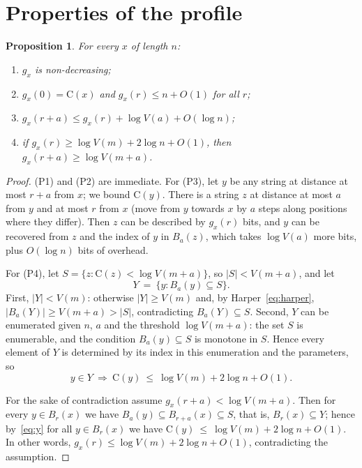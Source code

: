 \documentclass[11pt,a4paper]{article}
\newtheorem{proposition}[theorem]{Proposition}
\theoremstyle{definition}
\newcommand{\C}{\mathrm{C}}
\renewcommand{\le}{\leqslant}
\renewcommand{\ge}{\geqslant}
\begin{document}
\section{Properties of the profile}\label{sec:profile}

\begin{proposition}\label{prop:props}
For every $x$ of length $n$:
\begin{enumerate}
\item[(P1)] $g_x$ is non-decreasing;
\item[(P2)] $g_x(0)=\C(x)$ and $g_x(r)\le n+O(1)$ for all $r$;
\item[(P3)] $g_x(r+a)\le g_x(r)+\log V(a)+O(\log n)$;
\item[(P4)] if $g_x(r)\ge\log V(m)+2\log n+O(1)$, then
  $g_x(r+a)\ge\log V(m+a)$.
\end{enumerate}
\end{proposition}

\begin{proof}
(P1) and (P2) are immediate. For (P3), let $y$ be any string at distance at most
$r+a$ from $x$; we bound $\C(y)$. There is a string $z$ at distance at most $a$
from $y$ and at most $r$ from $x$ (move from $y$ towards $x$ by $a$ steps along
positions where they differ). Then $z$ can be described by $g_x(r)$ bits, and
$y$ can be recovered from $z$ and the index of $y$ in $B_a(z)$, which takes
$\log V(a)$ more bits, plus $O(\log n)$ bits of overhead.

For (P4), let $S=\{z:\C(z)<\log V(m+a)\}$, so $|S|<V(m+a)$, and let
\[
  Y\ =\ \{y: B_a(y)\subseteq S\} .
\]
First, $|Y|< V(m)$: otherwise $|Y|\ge V(m)$ and, by
Harper~\eqref{eq:harper}, $|B_a(Y)|\ge V(m+a)>|S|$, contradicting
$B_a(Y)\subseteq S$. Second, $Y$ can be enumerated given $n$, $a$ and the
threshold $\log V(m+a)$: the set $S$ is enumerable, and the condition
$B_a(y)\subseteq S$ is monotone in $S$. Hence every element of $Y$ is determined
by its index in this enumeration and the parameters, so
\begin{equation}\label{eq:y}
  y\in Y\ \Longrightarrow\ \C(y)\ \le\ \log V(m)+2\log n+O(1).
\end{equation}

For the sake of contradiction assume $g_x(r+a)<\log V(m+a)$. Then for every $y\in B_r(x)$ we have
$B_a(y)\subseteq B_{r+a}(x)\subseteq S$, that is, $B_r(x)\subseteq Y$; hence by~\eqref{eq:y} for all $y\in B_r(x)$ we have $\C(y)\ \le\ \log V(m)+2\log n+O(1)$. In other words,
$g_x(r)\le\log V(m)+2\log n+O(1)$, contradicting the assumption.
\end{proof}
\end{document}
